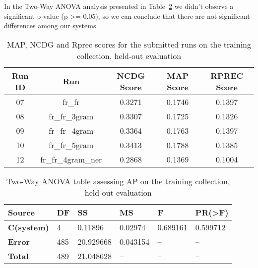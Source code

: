 In the Two-Way ANOVA analysis presented in Table~\ref{tab:ho_anova} we didn't observe a significant p-value (p >= 0.05),
so we can conclude that there are not significant differences among our systems.

\begin{table}[h!]
    \begin{center}
        \caption{MAP, NCDG and Rprec scores for the submitted runs on the training collection, held-out evaluation}
        \label{tab:ho_scores}
        \begin{tabular}{|c|c||c|c|c|}
            \hline
            \textbf{Run ID} & \textbf{Run} & \textbf{NCDG Score} & \textbf{MAP Score} & \textbf{RPREC Score}\\
            \hline\hline
            07 & fr\_fr & 0.3271 & 0.1746 & 0.1397 \\
            \hline
            08 & fr\_fr\_3gram & 0.3307 & 0.1725 & 0.1326 \\
            \hline
            09 & fr\_fr\_4gram & 0.3364 & 0.1763 & 0.1397 \\
            \hline
            10 & fr\_fr\_5gram & 0.3413 & 0.1788 & 0.1385 \\
            \hline
            12 & fr\_fr\_4gram\_ner & 0.2868 & 0.1369 & 0.1004 \\
            \hline
        \end{tabular}
    \end{center}
\end{table}

\begin{table}[h!]
    \centering
    \caption{Two-Way ANOVA table assessing AP on the training collection, held-out evaluation}
    \label{tab:ho_anova}
    \begin{tabular}{|l|l|l|l|l|l|}
    \hline
        \textbf{Source} & \textbf{DF} & \textbf{SS} & \textbf{MS} & \textbf{F} & \textbf{PR(>F)} \\ \hline\hline
        \textbf{C(system)} & 4 & 0.11896 & 0.02974 & 0.689161 & 0.599712 \\ \hline
        \textbf{Error} & 485 & 20.929668 & 0.043154 & -- & -- \\ \hline
        \textbf{Total} & 489 & 21.048628 & -- & -- & -- \\ \hline
    \end{tabular}
\end{table}

